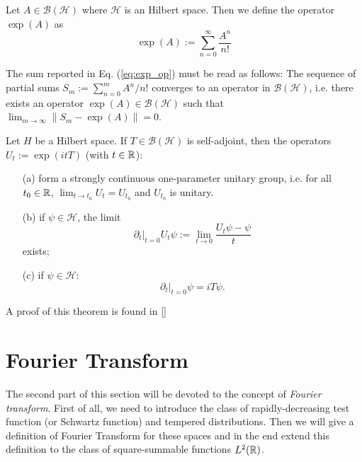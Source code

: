  \begin{definition}
 	Let $A\in\mathcal{B}(\mathcal{H})$ where $\mathcal{H}$ is an Hilbert space. Then we define the operator $\exp(A)$ as
 	\begin{equation}
 	\exp(A):=\sum_{n=0}^{\infty}\frac{A^n}{n!}
 	\label{eq:exp_op}
 	\end{equation}
 	\label{def:exp}
 \end{definition}
 \begin{oss}
 	The sum reported in Eq. (\ref{eq:exp_op}) must be read as follows: The sequence of partial sums $S_m:=\sum_{n=0}^{m}A^n/n!$ converges to an operator in $\mathcal{B}(\mathcal{H})$, i.e. there exists an operator $\exp(A)\in\mathcal{B}(\mathcal{H})$ such that $\lim_{m\to\infty}\|S_m-\exp(A)\|=0$.
 \end{oss}
 
 \begin{theorem}
 	\label{th:stone}
 	Let $H$ be a Hilbert space. If $T\in\mathcal{B}(\mathcal{H})$ is self-adjoint, then the operators $U_t:=\exp(itT)$ (with $t\in{\mathbb R}$):
 	\begin{itemize}
 		\item[(a)] form a strongly continuous one-parameter unitary group, i.e. for all $t_0\in{\mathbb R}$, $\lim_{t\to t_0}U_t=U_{t_0}$ and $U_{t_0}$ is unitary.
 		\item[(b)] if $\psi\in\mathcal{H}$, the limit
 		\begin{equation}
 			\partial_t|_{t=0}U_t\psi:=\lim_{t\to 0} \frac{U_t\psi-\psi}{t}
 		\end{equation}
 		exists;
 		\item[(c)] if $\psi\in\mathcal{H}$:
 		\begin{equation}
 			\partial_t|_{t=0}\psi=iT\psi.
 		\end{equation}
 	\end{itemize}
 \end{theorem}
 
 A proof of this theorem is found in [\citealp[Th. 9.33]{more}]
 
 
 \section{Fourier Transform}
 The second part of this section will be devoted to the concept of \textit{Fourier transform}. First of all, we need to introduce the class of rapidly-decreasing test function (or Schwartz function) and tempered distributions. Then we will give a definition of Fourier Transform for these spaces and in the end extend this definition to the class of square-summable functions $L^2({\mathbb R})$.
 
